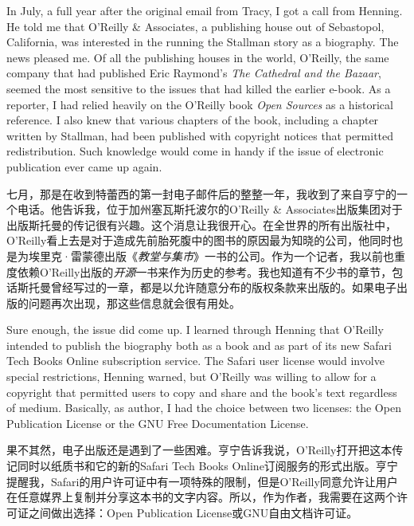 \ifdefined\eng
In July, a full year after the original email from Tracy, I got a call from Henning. He told me that O'Reilly \& Associates, a publishing house out of Sebastopol, California, was interested in the running the Stallman story as a biography. %
The news pleased me. Of all the publishing houses in the world, O'Reilly, the same company that had published Eric Raymond's \textit{The Cathedral and the Bazaar}, seemed the most sensitive to the issues that had killed the earlier e-book. As a reporter, I had relied heavily on the O'Reilly book \textit{Open Sources} as a historical reference. I also knew that various chapters of the book, including a chapter written by Stallman, had been published with copyright notices that permitted redistribution. Such knowledge would come in handy if the issue of electronic publication ever came up again.
\fi

\ifdefined\chs
七月，那是在收到特蕾西的第一封电子邮件后的整整一年，我收到了来自亨宁的一个电话。他告诉我，位于加州塞瓦斯托波尔的O'Reilly \& Associates出版集团对于出版斯托曼的传记很有兴趣。这个消息让我很开心。在全世界的所有出版社中，O'Reilly看上去是对于造成先前胎死腹中的图书的原因最为知晓的公司，他同时也是为埃里克·雷蒙德出版《\textit{教堂与集市}》一书的公司。作为一个记者，我以前也重度依赖O'Reilly出版的\textit{开源}一书来作为历史的参考。我也知道有不少书的章节，包话斯托曼曾经写过的一章，都是以允许随意分布的版权条款来出版的。如果电子出版的问题再次出现，那这些信息就会很有用处。
\fi

\ifdefined\eng
Sure enough, the issue did come up. I learned through Henning that O'Reilly intended to publish the biography both as a book and as part of its new Safari Tech Books Online subscription service. The Safari user license would involve special restrictions, Henning warned, but O'Reilly was willing to allow for a copyright that permitted users to copy and share and the book's text regardless of medium. Basically, as author, I had the choice between two licenses: the Open Publication License or the GNU Free Documentation License.
\fi

\ifdefined\chs
果不其然，电子出版还是遇到了一些困难。亨宁告诉我说，O'Reilly打开把这本传记同时以纸质书和它的新的Safari Tech Books Online订阅服务的形式出版。亨宁提醒我，Safari的用户许可证中有一项特殊的限制，但是O'Reilly同意允许让用户在任意媒界上复制并分享这本书的文字内容。所以，作为作者，我需要在这两个许可证之间做出选择：Open Publication License或GNU自由文档许可证。
\fi

